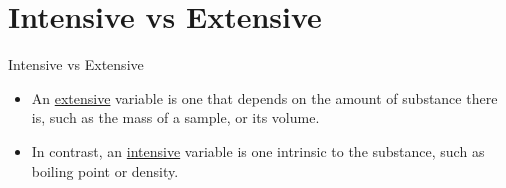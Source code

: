\documentclass{beamer}
\begin{document}
\section{Intensive vs Extensive}
\begin{frame}{Intensive vs Extensive}
  \begin{itemize}
  \item An \underline{extensive} variable is one that depends on the amount of substance there is, such as the mass of a sample, or its volume.
  \item In contrast, an \underline{intensive} variable is one intrinsic to the substance, such as boiling point or density. 
  \end{itemize}
\end{frame}
\end{document}
